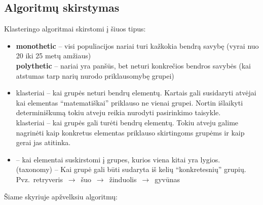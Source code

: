 \documentclass{VUMIFInfKursinis}
\begin{document}
\subsection{Algoritmų skirstymas}
Klasteringo algoritmai skirstomi į šiuos tipus:
\begin{itemize}
	\item \textbf{monothetic }– visi populiacijos nariai turi kažkokia bendrą savybę (vyrai nuo 20 iki 25 metų amžiaus)
		\\\textbf{polythetic }– nariai yra panšūs, bet neturi konkrečios bendros savybės (kai atstumas tarp narių nurodo priklausomybę grupei)
	\item {} klasteriai – kai grupės neturi bendrų elementų. Kartais gali susidaryti atvėjai kai elementas “matematiškai” priklauso ne vienai grupei. Nortin išlaikyti determiniškumą tokiu atveju reikia nurodyti pasirinkimo taisykle.
		\\ klasteriai – kai grupės gali turėti bendrų elementų. Tokiu atveju galime nagrinėti kaip konkretus elementas priklauso skirtingoms grupėms ir kaip gerai jas atitinka.
	\item {} – kai elementai suskirstomi į grupes, kurios viena kitai yra lygios.
		\\ (taxonomy) – Kai grupė gali būti sudaryta iš kelių “konkretesnių” grupių. Pvz.\ retryveris $\,\to\,$ šuo $\,\to\,$ žinduolis $\,\to\,$ gyvūnas
\end{itemize}
Šiame skyriuje apžvelksiu algoritmų:

{}
\end{document}
